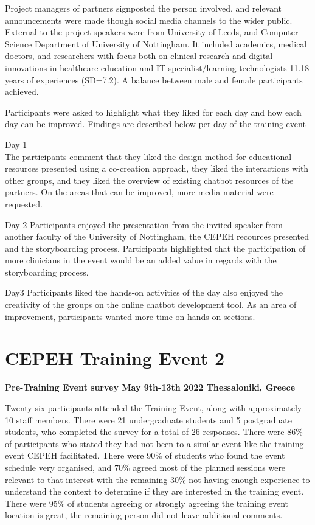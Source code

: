 \documentclass[a4paper, nobind]{templates/ociamthesis}
\begin{document}
Project managers of partners signposted the person involved, and relevant announcements were made though social media channels to the wider public. External to the project speakers were from University of Leeds, and Computer Science Department of University of Nottingham. It included academics, medical doctors, and researchers with focus both on clinical research and digital innovations in healthcare education and IT specialist/learning technologists 11.18 years of experiences (SD=7.2). A balance between male and female participants achieved.

Participants were asked to highlight what they liked for each day and how each day can be improved. Findings are described below per day of the training event

Day 1\\
The participants comment that they liked the design method for educational resources presented using a co-creation approach, they liked the interactions with other groups, and they liked the overview of existing chatbot resources of the partners. On the areas that can be improved, more media material were requested.

Day 2
Participants enjoyed the presentation from the invited speaker from another faculty of the University of Nottingham, the CEPEH recources presented and the storyboarding process. Participants highlighted that the participation of more clinicians in the event would be an added value in regards with the storyboarding process.

Day3
Participants liked the hands-on activities of the day also enjoyed the creativity of the groups on the online chatbot development tool. As an area of improvement, participants wanted more time on hands on sections.

\hypertarget{cepeh-training-event-2}{%
\section{CEPEH Training Event 2}\label{cepeh-training-event-2}}

\textbf{Pre-Training Event survey May 9th-13th 2022 Thessaloniki, Greece}

Twenty-six participants attended the Training Event, along with approximately 10 staff members. There were 21 undergraduate students and 5 postgraduate students, who completed the survey for a total of 26 responses. There were 86\% of participants who stated they had not been to a similar event like the training event CEPEH facilitated. There were 90\% of students who found the event schedule very organised, and 70\% agreed most of the planned sessions were relevant to that interest with the remaining 30\% not having enough experience to understand the context to determine if they are interested in the training event. There were 95\% of students agreeing or strongly agreeing the training event location is great, the remaining person did not leave additional comments.
\end{document}
